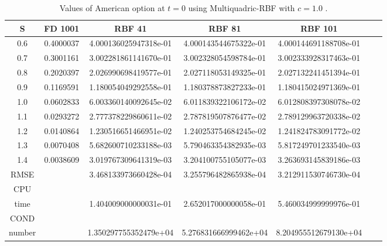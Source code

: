 \documentclass[12pt]{article}
\numberwithin{equation}{section} %
\begin{document}
\newpage
\begin{table}[h]
\centering
\begin{tabular}{|c|c|c|c|c|c|c|}
  \hline
  S & FD 1001  & RBF 41 & RBF 81 & RBF 101 \\
  \hline
  0.6 & 0.4000037 &4.000136025947318e-01  &   4.000143544675322e-01&  4.000144691188708e-01 \\
  0.7 & 0.3001161  & 3.002281861141670e-01 &   3.002328054598784e-01&3.002333928317463e-01 \\
  0.8 & 0.2020397  & 2.026990698419577e-01 & 2.027118053149325e-01 & 2.027132241451394e-01 \\
  0.9 & 0.1169591  & 1.180054049292558e-01  &  1.180378873827233e-01 &1.180415024971369e-01 \\
  1.0 & 0.0602833  & 6.003360140092645e-02 &  6.011839322106172e-02& 6.012808397308078e-02 \\
  1.1 & 0.0293272  & 2.777378229860611e-02  & 2.787819507876477e-02 &2.789129963720338e-02 \\
  1.2 & 0.0140864  & 1.230516651466951e-02 & 1.240253754684245e-02 & 1.241824783091772e-02 \\
  1.3 & 0.0070408  &  5.682600710233188e-03 &   5.790463354382935e-03& 5.817249701233540e-03 \\
  1.4 & 0.0038609  & 3.019767309641319e-03 & 3.204100755105077e-03 & 3.263693145839186e-03  \\
  \hline
  RMSE &   & 3.468133973660428e-04 &  3.255796482865938e-04 &  3.212911530746730e-04 \\
  \hline
  CPU &   &  &  &  \\
  time  &   & 1.404009000000031e-01  &   2.652017000000058e-01&  5.460034999999976e-01\\
  \hline
   COND &   &  &  &  \\
  number  &   & 1.350297755352479e+04  &  5.276831666999462e+04&  8.204955512679130e+04 \\
  \hline
\end{tabular}
  \caption{Values of American option at $t=0$ using Multiquadric-RBF with $c=1.0$ .}\label{Tab_1DFinal}
\end{table}
\end{document}
